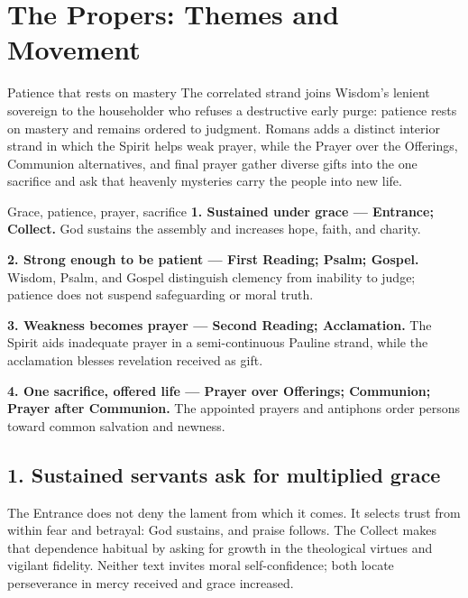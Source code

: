 \section*{The Propers: Themes and Movement}

\begin{massbox}{Patience that rests on mastery}
The correlated strand joins Wisdom's lenient sovereign to the householder who refuses a destructive early purge: patience rests on mastery and remains ordered to judgment. Romans adds a distinct interior strand in which the Spirit helps weak prayer, while the Prayer over the Offerings, Communion alternatives, and final prayer gather diverse gifts into the one sacrifice and ask that heavenly mysteries carry the people into new life.
\end{massbox}

\begin{studybox}{Grace, patience, prayer, sacrifice}
\textbf{1. Sustained under grace --- Entrance; Collect.} God sustains the assembly and increases hope, faith, and charity.\par\smallskip
\textbf{2. Strong enough to be patient --- First Reading; Psalm; Gospel.} Wisdom, Psalm, and Gospel distinguish clemency from inability to judge; patience does not suspend safeguarding or moral truth.\par\smallskip
\textbf{3. Weakness becomes prayer --- Second Reading; Acclamation.} The Spirit aids inadequate prayer in a semi-continuous Pauline strand, while the acclamation blesses revelation received as gift.\par\smallskip
\textbf{4. One sacrifice, offered life --- Prayer over Offerings; Communion; Prayer after Communion.} The appointed prayers and antiphons order persons toward common salvation and newness.
\end{studybox}

\subsection*{1. Sustained servants ask for multiplied grace\enspace{}}

The Entrance does not deny the lament from which it comes. It selects trust from within fear and betrayal: God sustains, and praise follows. The Collect makes that dependence habitual by asking for growth in the theological virtues and vigilant fidelity. Neither text invites moral self-confidence; both locate perseverance in mercy received and grace increased.

